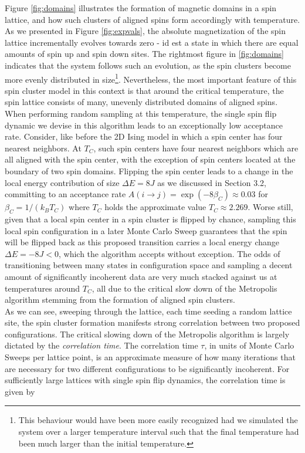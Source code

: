 Figure \ref{fig:domains} illustrates the formation of magnetic domains in a spin lattice, and how such clusters of aligned spins form accordingly with temperature. As we presented in Figure \ref{fig:expvals}, the absolute magnetization of the spin lattice incrementally evolves towards zero - id est a state in which there are equal amounts of spin up and spin down sites. The rightmost figure in \ref{fig:domains} indicates that the system follows such an evolution, as the spin clusters become more evenly distributed in size\footnote{This behaviour would have been more easily recognized had we simulated the system over a larger temperature interval such that the final temperature had been much larger than the initial temperature.}. Nevertheless, the most important feature of this spin cluster model in this context is that around the critical temperature, the spin lattice consists of many, unevenly distributed domains of aligned spins. When performing random sampling at this temperature, the single spin flip dynamic we devise in this algorithm leads to an exceptionally low acceptance rate. Consider, like before the 2D Ising model in which a spin center has four nearest neighbors. At $T_C$, such spin centers have four nearest neighbors which are all aligned with the spin center, with the exception of spin centers located at the boundary of two spin domains. Flipping the spin center leads to a change in the local energy contribution of size $\Delta E = 8J$ as we discussed in Section 3.2, committing to an acceptance rate $A(i \to j) = \exp(-8\beta_C) \approx 0.03$ for $\beta_C = 1/(k_B T_C)$ where $T_C$ holds the approximate value $T_C \approx 2.269$. Worse still, given that a local spin center in a spin cluster is flipped by chance, sampling this local spin configuration in a later Monte Carlo Sweep guarantees that the spin will be flipped back as this proposed transition carries a local energy change $\Delta E = -8J < 0$, which the algorithm accepts without exception. The odds of transitioning between many states in configuration space and sampling a decent amount of significantly incoherent data are very much stacked against us at temperatures around $T_C$, all due to the critical slow down of the Metropolis algorithm stemming from the formation of aligned spin clusters.\\

As we can see, sweeping through the lattice, each time seeding a random lattice site, the spin cluster formation manifests strong correlation between two proposed configurations. The critical slowing down of the Metropolis algorithm is largely dictated by the \textit{correlation time}. The correlation time $\tau$, in units of Monte Carlo Sweeps per lattice point, is an approximate measure of how many iterations that are necessary for two different configurations to be significantly incoherent. For sufficiently large lattices with single spin flip dynamics, the correlation time is given by

